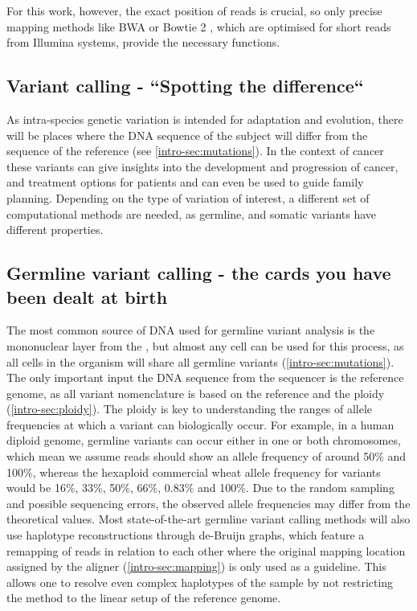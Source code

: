 For this work, however, the exact position of reads is crucial, so only precise mapping methods like BWA \cite{Li2013} or Bowtie 2 \cite{Langmead2018}, which are optimised for short reads from Illumina systems, provide the necessary functions.


\subsection[Variant calling]{Variant calling - ``Spotting the difference``}
\label{intro-sec:variantcalling}
As intra-species genetic variation is intended for adaptation and evolution, there will be places where the DNA sequence of the subject will differ from the sequence of the reference (see \autoref{intro-sec:mutations}). In the context of cancer these variants can give insights into the development and progression of cancer, and treatment options for patients and can even be used to guide family planning. Depending on the type of variation  of interest, a different set of computational methods are needed, as germline, and somatic variants have different properties.

\subsection[Germline]{Germline variant calling - the cards you have been dealt at birth}
\label{intro-sec:germlinecalling}
The most common source of DNA used for germline variant analysis is the mononuclear layer from the , but  almost any cell can be used for this process, as all cells in the organism will share all germline variants (\autoref{intro-sec:mutations}). The only important input  the DNA sequence from the sequencer is the  reference genome, as all variant nomenclature is based on the reference and the ploidy  (\autoref{intro-sec:ploidy}). The ploidy is key to understanding the ranges of allele frequencies at which a variant can biologically occur. For example, in a human diploid genome, germline variants can occur either in one or both chromosomes, which mean we assume reads should show an allele frequency of around 50\% and 100\%, whereas the hexaploid commercial wheat \cite{Mayer2014} allele frequency for variants would be 16\%, 33\%, 50\%, 66\%, 0.83\% and 100\%. Due to the random sampling and possible sequencing errors, the observed allele frequencies may differ from the theoretical values. 
Most state-of-the-art germline variant calling methods will also use haplotype reconstructions through de-Bruijn graphs, which feature a remapping of reads in relation to each other \cite{Garrison2012,Lai2016,Kim2018,Benjamin2019,Cooke2021} where the original mapping location assigned by the aligner (\autoref{intro-sec:mapping}) is only used as a guideline. This  allows one to resolve even complex haplotypes of the sample by not restricting the method to the linear setup of the reference genome.


